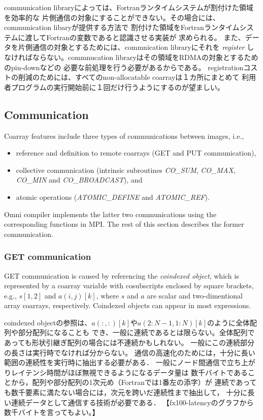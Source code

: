 communication libraryによっては、Fortranランタイムシステムが割付けた領域を効率的な
片側通信の対象にすることができない。その場合には、communication libaryが提供する方法で
割付けた領域をFortranランタイムシステムに渡してFortranの変数であると認識させる実装が
求められる。
また、データを片側通信の対象とするためには、commnication libraryにそれを {\em register}
しなければならない。commnucation libraryはその領域をRDMAの対象とするためのpin-downなどの
必要な前処理を行う必要があるからである。
registrationコストの削減のためには、すべてのnon-allocatable coarrayは１カ所にまとめて
利用者プログラムの実行開始前に１回だけ行うようにするのが望ましい。


\subsection{Communication}

Coarray features include three types of communications between images, i.e.,
\begin{itemize}
\item reference and definition to remote coarrays (GET and PUT communication),
\item collective communication (intrinsic subroutines {\em CO\_SUM}, {\em CO\_MAX}, 
{\em CO_MIN} and {\em CO_BROADCAST}), and
\item atomic operations ({\em ATOMIC\_DEFINE} and {\em ATOMIC\_REF}).
\end{itemize}

Omni compiler implements the latter two communications using the corresponding 
functions in MPI. The rest of this section describes the former communication.


\subsubsection{GET communication}

GET communication is caused by referencing the {\em coindexed object}, 
which is represented by a coarray variable with cosubscripts enclosed by square brackets, 
e.g., $s[1,2]$ and $a(i,j)[k]$, where $s$ and $a$ are scalar and two-dimentional array coarrays,
respectively.
Coindexed objects can appear in most expressions.

coindexed objectの参照は、$a(:,:)[k]$や$a(2:N-1,1:N)[k]$のように全体配列や部分配列になることも
でき、一般に連続であるとは限らない。全体配列であっても形状引継ぎ配列の場合には不連続かもしれない。
一般にこの連続部分の長さは実行時でなければ分からない。
通信の高速化のためには，十分に長い範囲の連続性を実行時に抽出する必要がある．
一般にノード間通信で立ち上がりレイテンシ時間がほぼ無視できるようになるデータ量は
数千バイトであることから，配列や部分配列の1次元め（Fortranでは1番左の添字）が
連続であっても数千要素に満たない場合には，次元を跨いだ連続性まで抽出して，
十分に長い連続データとして通信する技術が必要である．
【fx100-latencyのグラフから数千バイトを言ってもよい。】


